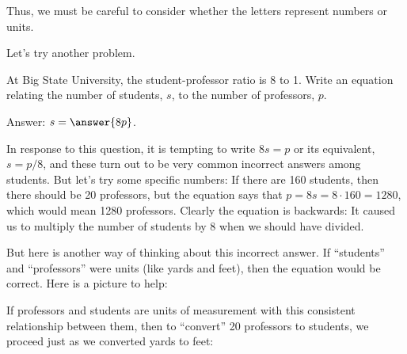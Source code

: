 \documentclass[nooutcomes]{ximera}
\begin{document}
Thus, we must be careful to consider whether the letters represent numbers or units.  

Let's try another problem.  

\begin{question}
At Big State University, the student-professor ratio is 8 to 1.  Write an equation relating the number of students, $s$, to the number of professors, $p$.  

Answer:  $s = \answer{8p}$.  
\end{question}

In response to this question, it is tempting to write $8s = p$ or its equivalent, $s=p/8$, and these turn out to be very common incorrect answers among students.  But let's try some specific numbers:  If there are 160 students, then there should be 20 professors, but the equation says that $p = 8s = 8\cdot 160 = 1280$, which would mean 1280 professors.  Clearly the equation is backwards: It caused us to multiply the number of students by 8 when we should have divided.  

But here is another way of thinking about this incorrect answer.  If ``students'' and ``professors'' were units (like yards and feet), then the equation would be correct. Here is a picture to help:  

\begin{image}
\end{image}

If professors and students are units of measurement with this consistent relationship between them, then to ``convert''  20 professors to students, we proceed just as we converted yards to feet:  
\end{document}
